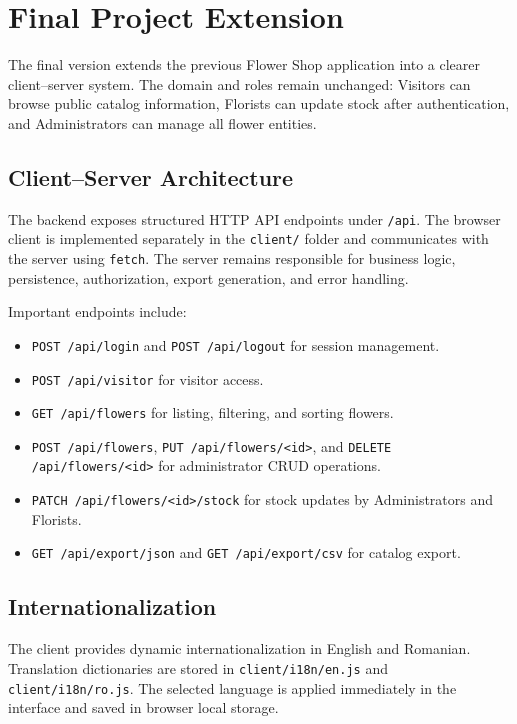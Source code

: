 \section{Final Project Extension}

\par The final version extends the previous Flower Shop application into a clearer client--server system. The domain and roles remain unchanged: Visitors can browse public catalog information, Florists can update stock after authentication, and Administrators can manage all flower entities.

\subsection{Client--Server Architecture}

\par The backend exposes structured HTTP API endpoints under \texttt{/api}. The browser client is implemented separately in the \texttt{client/} folder and communicates with the server using \texttt{fetch}. The server remains responsible for business logic, persistence, authorization, export generation, and error handling.

\par Important endpoints include:
\begin{itemize}
    \item \texttt{POST /api/login} and \texttt{POST /api/logout} for session management.
    \item \texttt{POST /api/visitor} for visitor access.
    \item \texttt{GET /api/flowers} for listing, filtering, and sorting flowers.
    \item \texttt{POST /api/flowers}, \texttt{PUT /api/flowers/<id>}, and \texttt{DELETE /api/flowers/<id>} for administrator CRUD operations.
    \item \texttt{PATCH /api/flowers/<id>/stock} for stock updates by Administrators and Florists.
    \item \texttt{GET /api/export/json} and \texttt{GET /api/export/csv} for catalog export.
\end{itemize}

\subsection{Internationalization}

\par The client provides dynamic internationalization in English and Romanian. Translation dictionaries are stored in \texttt{client/i18n/en.js} and \texttt{client/i18n/ro.js}. The selected language is applied immediately in the interface and saved in browser local storage.

